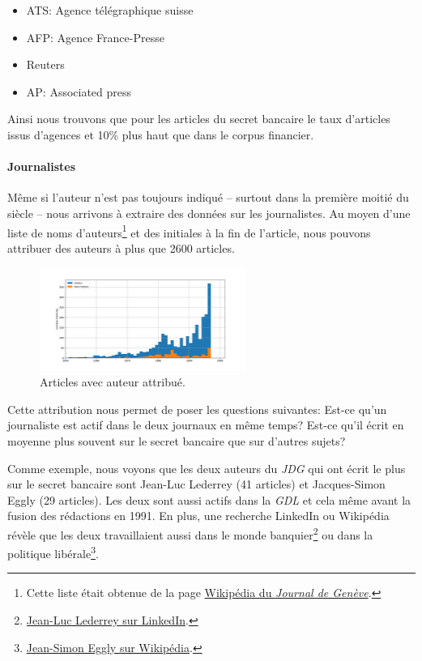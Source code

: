 \documentclass[11pt]{article}
\begin{document}
\begin{itemize}
\item
  ATS: Agence télégraphique suisse
\item
  AFP: Agence France-Presse
\item
  Reuters
\item
  AP: Associated press
\end{itemize}

Ainsi nous trouvons que pour les articles du secret bancaire le taux
d'articles issus d'agences et 10\% plus haut que dans le corpus
financier.

\newpage

\hypertarget{journalistes}{%
\paragraph{Journalistes}\label{journalistes}}

Même si l'auteur n'est pas toujours indiqué -- surtout dans la première
moitié du siècle -- nous arrivons à extraire des données sur les
journalistes. Au moyen d'une liste de noms d'auteurs\footnote{Cette
  liste était obtenue de la page
  \href{https://fr.wikipedia.org/wiki/Journal_de_Gen\%C3\%A8ve}{Wikipédia
  du \emph{Journal de Genève}}.} et des initiales à la fin de l'article,
nous pouvons attribuer des auteurs à plus que 2600 articles.

\begin{figure}
\centering
\includegraphics[width=0.6\textwidth]{methodology/author_attributed.png}
\caption{Articles avec auteur attribué.}
\end{figure}

Cette attribution nous permet de poser les questions suivantes: Est-ce
qu'un journaliste est actif dans le deux journaux en même temps? Est-ce
qu'il écrit en moyenne plus souvent sur le secret bancaire que sur
d'autres sujets?

Comme exemple, nous voyons que les deux auteurs du \emph{JDG} qui ont
écrit le plus sur le secret bancaire sont Jean-Luc Lederrey (41
articles) et Jacques-Simon Eggly (29 articles). Les deux sont aussi
actifs dans la \emph{GDL} et cela même avant la fusion des rédactions en
1991. En plus, une recherche LinkedIn ou Wikipédia révèle que les deux
travaillaient aussi dans le monde banquier\footnote{\href{https://ch.linkedin.com/in/lederrey-jean-luc-1456b717}{Jean-Luc
  Lederrey sur LinkedIn}.} ou dans la politique libérale\footnote{\href{https://fr.wikipedia.org/wiki/Jacques-Simon_Eggly}{Jean-Simon
  Eggly sur Wikipédia}.}.
\end{document}
